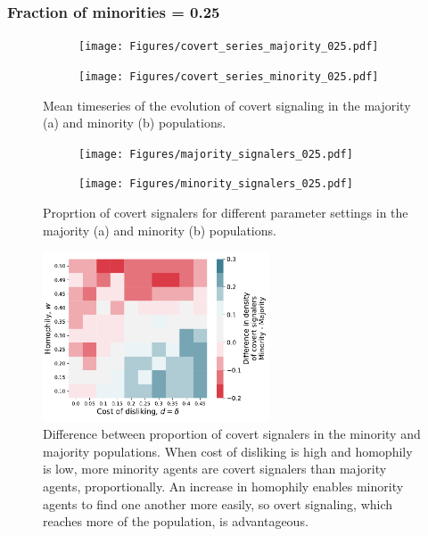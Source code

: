 \documentclass[11pt,letterpaper]{article}
\begin{document}
\subsubsection{Fraction of minorities = 0.25}

\begin{figure}[H]
  \centering
  \begin{subfigure}{0.49\textwidth}
    \centering
    \texttt{[image: Figures/covert\_series\_majority\_025.pdf]}
    \caption{}
    \label{fig:}
  \end{subfigure}
  \begin{subfigure}{0.49\textwidth}
    \centering
    \texttt{[image: Figures/covert\_series\_minority\_025.pdf]}
    \caption{}
    \label{fig:}
  \end{subfigure}
  \caption{Mean timeseries of the evolution of covert signaling in the
    majority (a) and minority (b) populations.}
  \label{fig:regressions}
\end{figure}


\begin{figure}[H]
  \centering
  \begin{subfigure}{0.49\textwidth}
    \centering
    \texttt{[image: Figures/majority\_signalers\_025.pdf]}
    \caption{}
    \label{fig:}
  \end{subfigure}
  \begin{subfigure}{0.49\textwidth}
    \centering
    \texttt{[image: Figures/minority\_signalers\_025.pdf]}
    \caption{}
    \label{fig:}
  \end{subfigure}
  \caption{Proprtion of covert signalers for different parameter settings in the
    majority (a) and minority (b) populations.}
  \label{fig:regressions}
\end{figure}

\begin{figure}[H]
  \centering
    \includegraphics[width=0.6\textwidth]{Figures/covert_signalers_diff_025.pdf}
  \caption{Difference between proportion of covert signalers in the minority 
    and majority populations. When cost of disliking is high and homophily is 
    low, more minority agents are covert signalers than majority agents,
    proportionally. An increase in homophily enables minority agents to 
    find one another more easily, so overt signaling, which reaches more of
    the population, is advantageous.
  }
  \label{fig:}
\end{figure}
\end{document}
